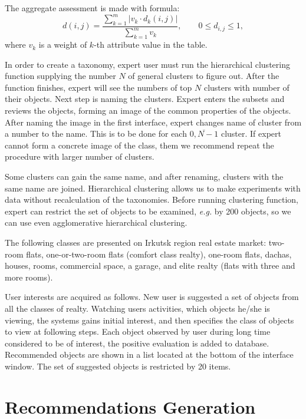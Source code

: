 \documentclass[conference,a4]{IEEEtran}
\begin{document}
The aggregate assessment is made with formula:
\[
  d(i,j)=\frac{\sum\limits_{k=1}^m|v_k\cdot d_k(i,j)|}{\sum\limits_{k=1}^m v_k}, \qquad 0\leqslant d_{i,j}\leqslant 1,
\]
\noindent where $v_k$ is a weight of $k$-th attribute value in the table. %

In order to create a taxonomy, expert user must run the hierarchical clustering function supplying the number $N$ of general clusters to figure out.  After the function finishes, expert will see the numbers of top $N$ clusters with number of their objects.  Next step is naming the clusters.  Expert enters the subsets and reviews the objects, forming an image of the common properties of the objects.  After naming the image in the first interface, expert changes name of cluster from a number to the name.  This is to be done for each $\overline{0,N-1}$ cluster.  If expert cannot form a concrete image of the class, them we recommend repeat the procedure with larger number of clusters.

Some clusters can gain the same name, and after renaming, clusters with the same name are joined.  Hierarchical clustering allows us to make experiments with data without recalculation of the taxonomies.  Before running clustering function, expert can restrict the set of objects to be examined, \emph{e.g.} by 200 objects, so we can use even agglomerative hierarchical clustering.

The following classes are presented on Irkutsk region real estate market: two-room flats, one-or-two-room flats (comfort class realty), one-room flats, dachas, houses, rooms, commercial space, a garage, and elite realty (flats with three and more rooms).

User interests are acquired as follows.  New user is suggested a set of objects from all the classes of realty.  Watching users activities, which objects he/she is viewing, the systems gains initial interest, and then specifies the class of objects to view at following steps.  Each object observed by user during long time considered to be of interest, the positive evaluation is added to database.  Recommended objects are shown in a list located at the bottom of the interface window.  The set of suggested objects is restricted by 20 items.

\section{Recommendations Generation}
\label{sec:proc-recs}
\end{document}
